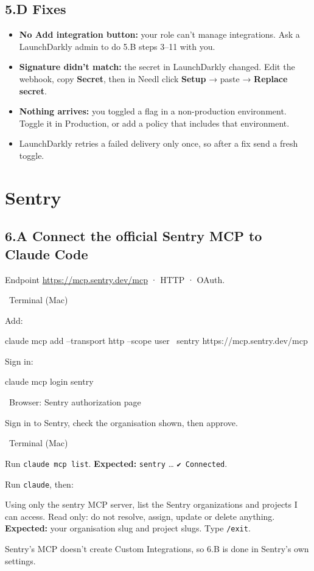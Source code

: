 \documentclass[11pt,a4paper]{article}
\newcommand{\ui}[1]{\textbf{#1}}
\newcommand{\where}[1]{\par\smallskip\noindent\colorbox{winbg}{\color{winfg}\bfseries\strut\ #1\ }\par\nopagebreak[4]}
\newcommand{\lit}[1]{\texttt{#1}}
\newenvironment{prompt}{\def\FrameCommand{\fboxsep=6pt\fcolorbox{Gray}{okbg}}\MakeFramed{\advance\hsize-\width\FrameRestore}\raggedright}{\endMakeFramed}
\begin{document}
\subsection*{5.D Fixes}
\begin{itemize}
\item \textbf{No \ui{Add integration} button:} your role can't manage integrations. Ask a LaunchDarkly admin to do 5.B steps 3–11 with you.
\item \textbf{Signature didn't match:} the secret in LaunchDarkly changed. Edit the webhook, copy \ui{Secret}, then in Needl click \ui{Setup} → paste → \ui{Replace secret}.
\item \textbf{Nothing arrives:} you toggled a flag in a non-production environment. Toggle it in Production, or add a policy that includes that environment.
\item LaunchDarkly retries a failed delivery only once, so after a fix send a fresh toggle.
\end{itemize}

\clearpage
\section{Sentry}
\subsection*{6.A Connect the official Sentry MCP to Claude Code}
Endpoint \url{https://mcp.sentry.dev/mcp} · HTTP · OAuth.
\where{Terminal (Mac)}
\begin{steps}
\item Add:
\begin{cmd}
claude mcp add --transport http --scope user \
  sentry https://mcp.sentry.dev/mcp
\end{cmd}
\item Sign in:
\begin{cmd}
claude mcp login sentry
\end{cmd}
\where{Browser: Sentry authorization page}
\item Sign in to Sentry, check the organisation shown, then approve.
\where{Terminal (Mac)}
\item Run \lit{claude mcp list}. \textbf{Expected:} \lit{sentry} … \lit{✔ Connected}.
\item Run \lit{claude}, then:
\begin{prompt}
Using only the sentry MCP server, list the Sentry organizations and projects I can access. Read only: do not resolve, assign, update or delete anything.
\end{prompt}
\textbf{Expected:} your organisation slug and project slugs. Type \lit{/exit}.
\end{steps}
Sentry's MCP doesn't create Custom Integrations, so 6.B is done in Sentry's own settings.
\end{document}
